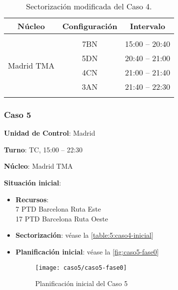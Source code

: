 \begin{table}[h]
	\centering
	\caption{Sectorización modificada del Caso 4.}
	\label{table:D:caso4-modif}
	\begin{tabular}{lcl}
		\hline
		\multicolumn{1}{c}{\textbf{Núcleo}}              & \textbf{Configuración} & \multicolumn{1}{c}{\textbf{Intervalo}} \\ \hline
		& \multicolumn{1}{l}{}   &                                        \\
		\multicolumn{1}{l|}{\multirow{4}{*}{Madrid TMA}} & 7BN                    & 15:00 -- 20:40                         \\
		\multicolumn{1}{l|}{}                            & 5DN                    & 20:40 -- 21:00                         \\
		\multicolumn{1}{l|}{}                            & 4CN                    & 21:00 -- 21:40                         \\
		\multicolumn{1}{l|}{}                            & 3AN                    & 21:40 -- 22:30                         \\
		\multicolumn{1}{c}{}                             &                        & \multicolumn{1}{c}{}                   \\ \hline
	\end{tabular}
\end{table}

\subsubsection{Caso 5}

\textbf{Unidad de Control}: Madrid

\textbf{Turno}: TC, 15:00 -- 22:30

\textbf{Núcleo}: Madrid TMA

\textbf{Situación inicial}:
\begin{itemize}[label={}]
	
	\item \textbf{Recursos}: \\
	7 PTD Barcelona Ruta Este \\
	17 PTD Barcelona Ruta Oeste
	
	\item \textbf{Sectorización}: véase la \autoref{table:5:caso4-inicial}
	
	\item \textbf{Planificación inicial}: véase la \autoref{fig:caso5-fase0}

	\begin{figure}[!h]
		\centering
		\texttt{[image: caso5/caso5-fase0]}
		\caption{Planificación inicial del Caso 5}
		\label{fig:5:caso5-fase0}
	\end{figure}

\end{itemize}

